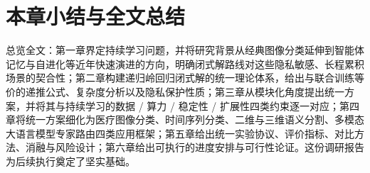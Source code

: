 \section{本章小结与全文总结}

总览全文：第一章界定持续学习问题，并将研究背景从经典图像分类延伸到智能体记忆与自进化等近年快速演进的方向，明确闭式解路线对这些隐私敏感、长程累积场景的契合性；第二章构建递归岭回归闭式解的统一理论体系，给出与联合训练等价的递推公式、复杂度分析以及隐私保护性质；第三章从模块化角度提出统一方案，并将其与持续学习的数据 / 算力 / 稳定性 / 扩展性四类约束逐一对应；第四章将统一方案细化为医疗图像分类、时间序列分类、二维与三维语义分割、多模态大语言模型专家路由四类应用框架；第五章给出统一实验协议、评价指标、对比方法、消融与风险设计；第六章给出可执行的进度安排与可行性论证。这份调研报告为后续执行奠定了坚实基础。
